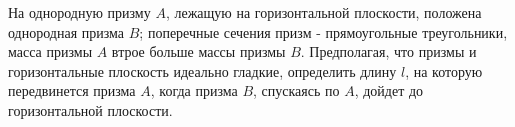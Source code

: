На однородную призму $A$, лежащую на горизонтальной плоскости, положена
однородная призма $B$; поперечные сечения призм - прямоугольные 
треугольники, масса призмы $A$ втрое больше массы призмы $B$. Предполагая,
что призмы и горизонтальные плоскость идеально гладкие, определить длину 
$l$, на которую передвинется призма $A$, когда призма $B$, спускаясь
по $A$, дойдет до горизонтальной плоскости.
